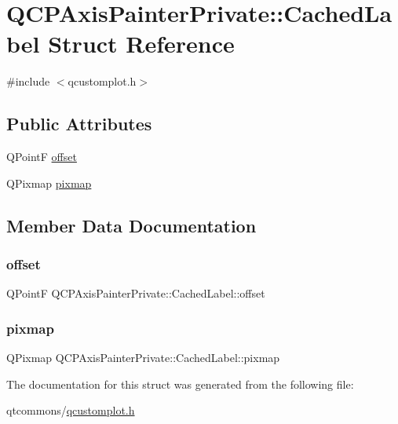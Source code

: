 \hypertarget{struct_q_c_p_axis_painter_private_1_1_cached_label}{}\section{Q\+C\+P\+Axis\+Painter\+Private\+::Cached\+Label Struct Reference}
\label{struct_q_c_p_axis_painter_private_1_1_cached_label}


{\ttfamily \#include $<$qcustomplot.\+h$>$}

\subsection*{Public Attributes}
\begin{DoxyCompactItemize}
\item 
Q\+PointF \mbox{\hyperlink{struct_q_c_p_axis_painter_private_1_1_cached_label_a5f502db71c92e572f1e6f44f62c59d8e}{offset}}
\item 
Q\+Pixmap \mbox{\hyperlink{struct_q_c_p_axis_painter_private_1_1_cached_label_a461597cbd470914a9d24b64d16037a88}{pixmap}}
\end{DoxyCompactItemize}


\subsection{Member Data Documentation}
\mbox{\label{struct_q_c_p_axis_painter_private_1_1_cached_label_a5f502db71c92e572f1e6f44f62c59d8e}} 
\subsubsection{\texorpdfstring{offset}{offset}}
{\footnotesize\ttfamily Q\+PointF Q\+C\+P\+Axis\+Painter\+Private\+::\+Cached\+Label\+::offset}

\mbox{\label{struct_q_c_p_axis_painter_private_1_1_cached_label_a461597cbd470914a9d24b64d16037a88}} 
\subsubsection{\texorpdfstring{pixmap}{pixmap}}
{\footnotesize\ttfamily Q\+Pixmap Q\+C\+P\+Axis\+Painter\+Private\+::\+Cached\+Label\+::pixmap}



The documentation for this struct was generated from the following file\+:\begin{DoxyCompactItemize}
\item 
qtcommons/\mbox{\hyperlink{qcustomplot_8h}{qcustomplot.\+h}}\end{DoxyCompactItemize}

